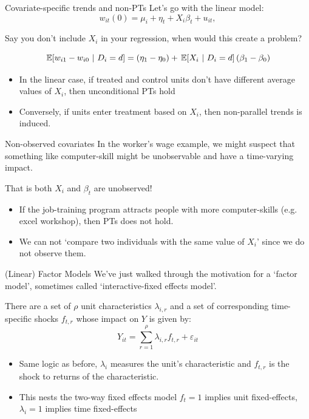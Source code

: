 \documentclass[t]{beamer}
\begin{document}
\begin{frame}{Covariate-specific trends and non-PTs}
  Let's go with the linear model:
  $$
    w_{it}(0) = \mu_i + \eta_t + X_i \beta_t + u_{it},
  $$

  \pause
  Say you don't include $X_i$ in your regression, when would this create a problem?

  $$
    \expec{w_{i1} - w_{i0}}{D_i = d} =
      \left( \eta_1 - \eta_0 \right) +
      \expec{X_i}{D_i = d} \left( \beta_1 - \beta_0 \right)
  $$
  \begin{itemize}
    \item In the linear case, if treated and control units don't have different average values of $X_i$, then unconditional PTs hold

    \item Conversely, if units enter treatment based on $X_i$, then non-parallel trends is induced.
  \end{itemize}
\end{frame}

\begin{frame}{Non-observed covariates}
  In the worker's wage example, we might suspect that something like computer-skill might be unobservable and have a time-varying impact.

  \bigskip That is both $X_i$ and $\beta_t$ are unobserved!

  \begin{itemize}
    \item If the job-training program attracts people with more computer-skills (e.g. excel workshop), then PTs does not hold.
    \item We can not `compare two individuals with the same value of $X_i$' since we do not observe them.
  \end{itemize}
\end{frame}


\begin{frame}{(Linear) Factor Models}
  We've just walked through the motivation for a `factor model', sometimes called `interactive-fixed effects model'.

  \bigskip
  There are a set of $\rho$ unit characteristics $\lambda_{i,r}$ and a set of corresponding time-specific shocks $f_{t, r}$ whose impact on $Y$ is given by:
  $$
    Y_{it} = \sum_{r=1}^\rho \lambda_{i, r} f_{t, r} + \varepsilon_{it}
  $$

  \begin{itemize}
    \item Same logic as before, $\lambda_i$ measures the unit's characteristic and $f_{t,r}$ is the shock to returns of the characteristic.

    \pause
    \item This nests the two-way fixed effects model $f_t = 1$ implies unit fixed-effects, $\lambda_i = 1$ implies time fixed-effects
  \end{itemize}
\end{frame}
\end{document}
